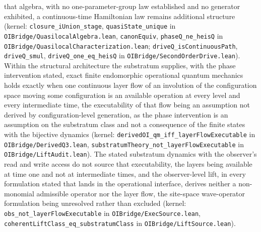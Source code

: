 \documentclass[
]{article}
\begin{document}
that algebra, with no one-parameter-group law established and no
generator exhibited, a continuous-time Hamiltonian law remains
additional structure (kernel: \texttt{closure\_iUnion\_stage},
\texttt{quasiState\_unique} in \texttt{OIBridge/QuasilocalAlgebra.lean},
\texttt{canonEquiv}, \texttt{phaseQ\_ne\_heisQ} in
\texttt{OIBridge/QuasilocalCharacterization.lean};
\texttt{driveQ\_isContinuousPath}, \texttt{driveQ\_smul},
\texttt{driveQ\_one\_eq\_heisQ} in
\texttt{OIBridge/SecondOrderDrive.lean}). Within the structural
architecture the substratum supplies, with the phase intervention
stated, exact finite endomorphic operational quantum mechanics holds
exactly when one continuous layer flow of an involution of the
configuration space moving some configuration is an available operation
at every level and every intermediate time, the executability of that
flow being an assumption not derived by configuration-level generation,
as the phase intervention is an assumption on the substratum class and
not a consequence of the finite states with the bijective dynamics
(kernel:
\texttt{derivedOI\_qm\_iff\_layerFlowExecutable\textquotesingle{}} in
\texttt{OIBridge/DerivedQ3.lean},
\texttt{substratumTheory\_not\_layerFlowExecutable} in
\texttt{OIBridge/LiftAudit.lean}). The stated substratum dynamics with
the observer's read and write access do not source that executability,
the layers being available at time one and not at intermediate times,
and the observer-level lift, in every formulation stated that lands in
the operational interface, derives neither a non-monomial admissible
operator nor the layer flow, the site-space wave-operator formulation
being unresolved rather than excluded (kernel:
\texttt{obs\_not\_layerFlowExecutable} in
\texttt{OIBridge/ExecSource.lean},
\texttt{coherentLiftClass\_eq\_substratumClass} in
\texttt{OIBridge/LiftSource.lean}).
\end{document}
